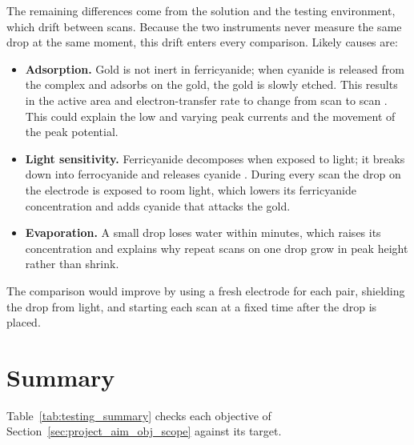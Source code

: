 The remaining differences come from the solution and the testing environment, which drift between scans. Because the two instruments never measure the same drop at the same moment, this drift enters every comparison. Likely causes are:
\begin{itemize}[label=\textbullet]
  \item \textbf{Adsorption.} Gold is not inert in ferricyanide; when cyanide is 
    released from the complex and adsorbs on the gold, the gold is slowly etched. This results in the active area and electron-transfer rate to change from scan to scan \cite{vogt2016,lazar2016}. This could explain the low and varying peak currents and the movement of the peak potential.
  \item \textbf{Light sensitivity.} Ferricyanide decomposes when exposed to light; it breaks down into ferrocyanide and releases cyanide \cite{murton2025}. During every scan the drop on the electrode is exposed to room light, which lowers its ferricyanide concentration and adds cyanide that attacks the gold.
  \item \textbf{Evaporation.} A small drop loses water within minutes, which
    raises its concentration and explains why repeat scans on one drop grow in peak height rather than shrink.
\end{itemize}
The comparison would improve by using a fresh electrode for each pair,
shielding the drop from light, and starting each scan at a fixed time after the
drop is placed. 
 
\section{Summary}
\label{sec:testing_summary}
 
Table~\ref{tab:testing_summary} checks each objective of Section~\ref{sec:project_aim_obj_scope} against its target.

